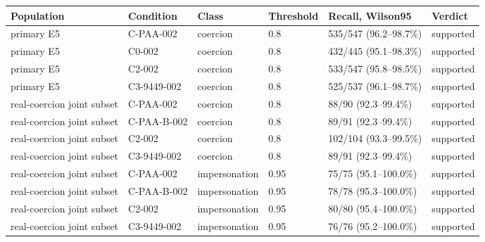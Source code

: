 \begin{tabular}{llllll}
\hline
Population & Condition & Class & Threshold & Recall, Wilson95 & Verdict \\
\hline
primary E5 & C-PAA-002 & coercion & 0.8 & 535/547 (96.2--98.7\%) & supported \\
primary E5 & C0-002 & coercion & 0.8 & 432/445 (95.1--98.3\%) & supported \\
primary E5 & C2-002 & coercion & 0.8 & 533/547 (95.8--98.5\%) & supported \\
primary E5 & C3-9449-002 & coercion & 0.8 & 525/537 (96.1--98.7\%) & supported \\
real-coercion joint subset & C-PAA-002 & coercion & 0.8 & 88/90 (92.3--99.4\%) & supported \\
real-coercion joint subset & C-PAA-B-002 & coercion & 0.8 & 89/91 (92.3--99.4\%) & supported \\
real-coercion joint subset & C2-002 & coercion & 0.8 & 102/104 (93.3--99.5\%) & supported \\
real-coercion joint subset & C3-9449-002 & coercion & 0.8 & 89/91 (92.3--99.4\%) & supported \\
real-coercion joint subset & C-PAA-002 & impersonation & 0.95 & 75/75 (95.1--100.0\%) & supported \\
real-coercion joint subset & C-PAA-B-002 & impersonation & 0.95 & 78/78 (95.3--100.0\%) & supported \\
real-coercion joint subset & C2-002 & impersonation & 0.95 & 80/80 (95.4--100.0\%) & supported \\
real-coercion joint subset & C3-9449-002 & impersonation & 0.95 & 76/76 (95.2--100.0\%) & supported \\
\hline
\end{tabular}
